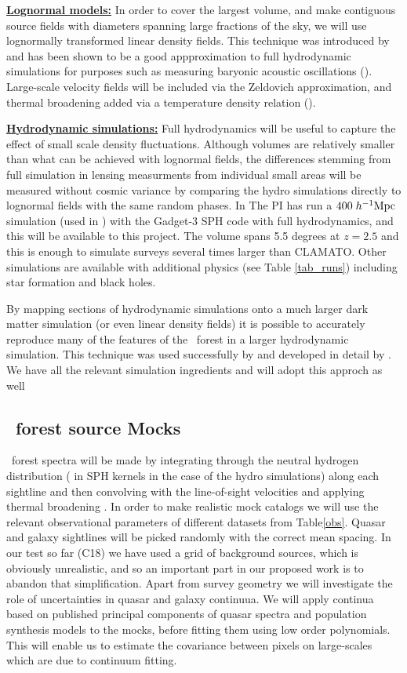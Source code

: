 {\bf \underline{Lognormal models:}}
In order to cover the largest volume, and make contiguous source
fields with diameters spanning large fractions of the sky,
 we will use lognormally transformed
linear density fields. This technique was introduced by \cite{bi1997}
and has been shown to be a good appproximation to full hydrodynamic
simulations for purposes such as measuring baryonic acoustic oscillations
(\citealt{legoff}). Large-scale velocity fields will be included via the
Zeldovich approximation, and thermal broadening added via a temperature
density relation (\citealt{keating17}).

{\bf \underline{Hydrodynamic simulations:}}
Full hydrodynamics  will be useful to capture the effect of
small scale density fluctuations.
 Although volumes are relatively smaller
than what can be achieved with lognormal fields, the differences stemming
from
full simulation  in
lensing measurments from individual small areas will be measured without
cosmic variance by comparing the hydro simulations directly to lognormal
fields with the same random phases. In 
The PI has run  a $400\;h^{-1}{\rm Mpc}$ simulation 
(used in \citealt{cisewski}) 
 with 
the Gadget-3 SPH code with full hydrodynamics, and this will be available to
this project. The volume spans 5.5 degrees at $z=2.5$ and this is enough
to simulate surveys several times larger than CLAMATO. Other
simulations are available with additional physics  (see Table 
\ref{tab_runs})
including star formation and black holes.

By mapping sections of hydrodynamic simulations onto a much larger
dark matter simulation (or even linear density fields) it is possible
to accurately reproduce many of the features of the \lya\ forest
in a larger hydrodynamic simulation. This
technique was used successfully by \cite{croft2004} and developed in
detail by \cite{peirani2014}. We have all the relevant 
simulation ingredients and will adopt this approch as well

\subsection{\lya\ forest source Mocks}
\lya\ forest spectra will be made by integrating through the
neutral hydrogen distribution ( in SPH kernels in the case of the hydro
simulations)
along each sightline and then convolving with the line-of-sight velocities
and applying thermal broadening \citep{hernquist1996}.
 In order to make realistic
mock catalogs we will use the relevant observational parameters
of different datasets from Table\ref{obs}. Quasar and galaxy sightlines will
be picked randomly with the correct mean spacing. In our test so far
(C18) we have used a grid of background sources, which is obviously
unrealistic, and so an important part in our proposed work is to abandon
that simplification. Apart from survey geometry we will investigate
the role of uncertainties in  quasar and galaxy continuua. We will 
apply continua based on published principal components
of quasar spectra \citep{leedr9} and population synthesis models
to the mocks, before fitting them using low order polynomials. This will
enable us to estimate the covariance between pixels on large-scales which
are due to continuum fitting.


